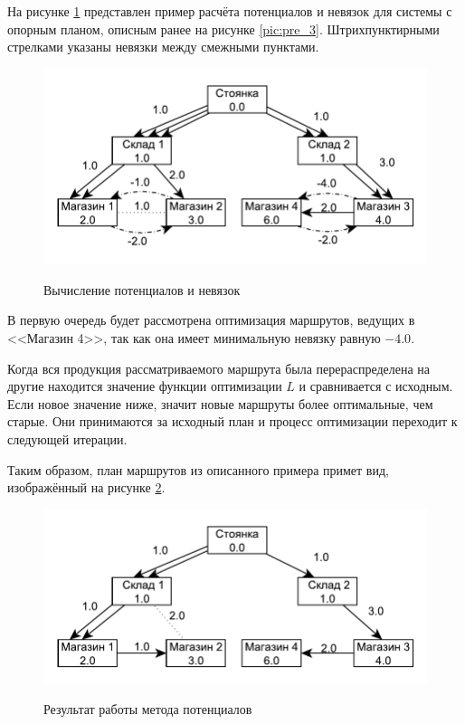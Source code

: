 	На рисунке \ref{pic:pot_1} представлен пример расчёта потенциалов и невязок для системы с опорным планом, описным ранее на рисунке \ref{pic:pre_3}. Штрихпунктирными стрелками указаны невязки между смежными пунктами.
	
 	\begin{figure}[h]
		\begin{center}
			{\includegraphics[scale=1.0, angle=0]{img/potential_demo_1.pdf}}
			\caption{Вычисление потенциалов и невязок}
			\label{pic:pot_1}
		\end{center}
	\end{figure}

	В первую очередь будет рассмотрена оптимизация маршрутов, ведущих в <<Магазин 4>>, так как она имеет минимальную невязку равную $-4.0$.
	
	Когда вся продукция рассматриваемого маршрута была перераспределена на другие находится значение функции оптимизации $L$ и сравнивается с исходным. Если новое значение ниже, значит новые маршруты более оптимальные, чем старые. Они принимаются за исходный план и процесс оптимизации переходит к следующей итерации.
	
	Таким образом, план маршрутов из описанного примера примет вид, изображённый на рисунке \ref{pic:pot_2}.
	
 	\begin{figure}[h]
		\begin{center}
			{\includegraphics[scale=1.0, angle=0]{img/potential_demo_2.pdf}}
			\caption{Результат работы метода потенциалов}
			\label{pic:pot_2}
		\end{center}
	\end{figure}
	

